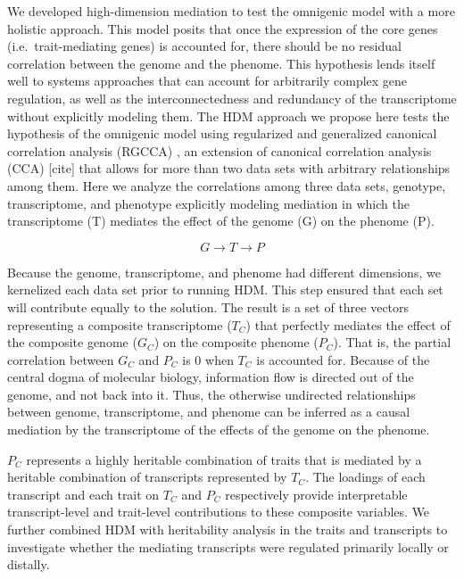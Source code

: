 \documentclass[
]{article}
\begin{document}
We developed high-dimension mediation to test the omnigenic model with a
more holistic approach. This model posits that once the expression of
the core genes (i.e.~trait-mediating genes) is accounted for, there
should be no residual correlation between the genome and the phenome.
This hypothesis lends itself well to systems approaches that can account
for arbitrarily complex gene regulation, as well as the
interconnectedness and redundancy of the transcriptome without
explicitly modeling them. The HDM approach we propose here tests the
hypothesis of the omnigenic model using regularized and generalized
canonical correlation analysis (RGCCA) \cite{rgcca}, an extension of
canonical correlation analysis (CCA) {[}cite{]} that allows for more
than two data sets with arbitrary relationships among them. Here we
analyze the correlations among three data sets, genotype, transcriptome,
and phenotype explicitly modeling mediation in which the transcriptome
(T) mediates the effect of the genome (G) on the phenome (P).

\begin{equation*}
G \rightarrow T \rightarrow P
\end{equation*}

Because the genome, transcriptome, and phenome had different dimensions,
we kernelized each data set prior to running HDM. This step ensured that
each set will contribute equally to the solution. The result is a set of
three vectors representing a composite transcriptome (\(T_C\)) that
perfectly mediates the effect of the composite genome (\(G_C\)) on the
composite phenome (\(P_C\)). That is, the partial correlation between
\(G_C\) and \(P_C\) is 0 when \(T_C\) is accounted for. Because of the
central dogma of molecular biology, information flow is directed out of
the genome, and not back into it. Thus, the otherwise undirected
relationships between genome, transcriptome, and phenome can be inferred
as a causal mediation by the transcriptome of the effects of the genome
on the phenome.

\(P_C\) represents a highly heritable combination of traits that is
mediated by a heritable combination of transcripts represented by
\(T_C\). The loadings of each transcript and each trait on \(T_C\) and
\(P_C\) respectively provide interpretable transcript-level and
trait-level contributions to these composite variables. We further
combined HDM with heritability analysis in the traits and transcripts to
investigate whether the mediating transcripts were regulated primarily
locally or distally.
\end{document}

